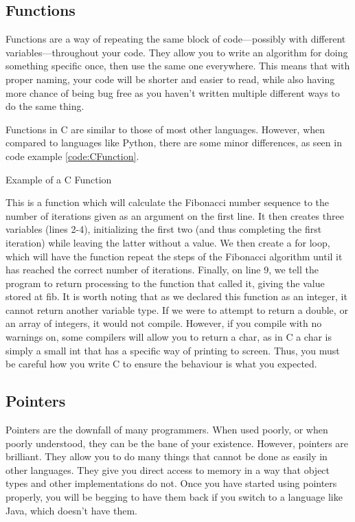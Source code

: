 		\subsection{Functions}
			Functions are a way of repeating the same block of code---possibly with different variables---throughout your code.
			They allow you to write an algorithm for doing something specific once, then use the same one everywhere.
			This means that with proper naming, your code will be shorter and easier to read, while also having more chance of being bug free as you haven't written multiple different ways to do the same thing.

			Functions in C are similar to those of most other languages.
			However, when compared to languages like Python, there are some minor differences, as seen in code example \ref{code:CFunction}.
			\begin{code}
				\caption{Example of a C Function}
				\label{code:CFunction}
			\end{code}
			This is a function which will calculate the Fibonacci number sequence to the number of iterations given as an argument on the first line.
			It then creates three variables (lines 2-4), initializing the first two (and thus completing the first iteration) while leaving the latter without a value.
			We then create a for loop, which will have the function repeat the steps of the Fibonacci algorithm until it has reached the correct number of iterations.
			Finally, on line 9, we tell the program to return processing to the function that called it, giving the value stored at fib.
			It is worth noting that as we declared this function as an integer, it cannot return another variable type.
			If we were to attempt to return a double, or an array of integers, it would not compile.
			However, if you compile with no warnings on, some compilers will allow you to return a char, as in C a char is simply a small int that has a specific way of printing to screen.
			Thus, you must be careful how you write C to ensure the behaviour is what you expected.

		\subsection{Pointers}
			Pointers are the downfall of many programmers.
			When used poorly, or when poorly understood, they can be the bane of your existence.
			However, pointers are brilliant.
			They allow you to do many things that cannot be done as easily in other languages.
			They give you direct access to memory in a way that object types and other implementations do not.
			Once you have started using pointers properly, you will be begging to have them back if you switch to a language like Java, which doesn't have them.

